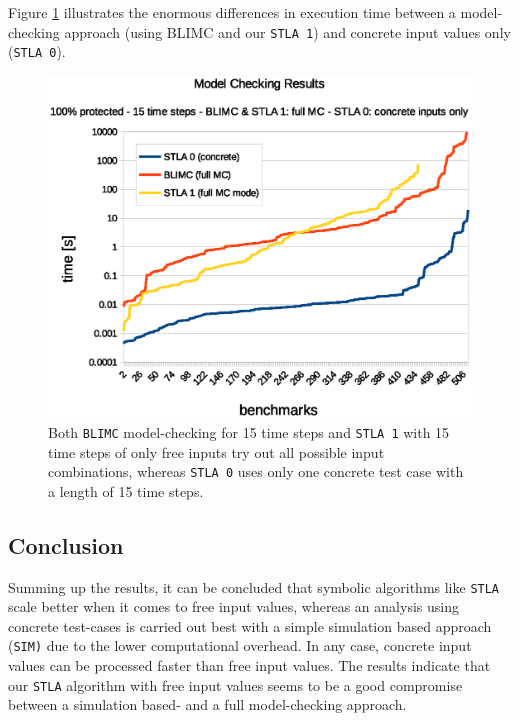 \documentclass[a4paper,10pt]{article}
\begin{document}
Figure \ref{mc-chart} illustrates the enormous differences in execution time between a model-checking approach (using BLIMC and our \texttt{STLA 1}) and concrete input values only (\texttt{STLA 0}).


\begin{figure}[!htb]
\centering
\includegraphics[scale = 0.64]{img/mc.eps}
\centering \caption{Both \texttt{BLIMC} model-checking for 15 time steps and \texttt{STLA 1} with 15 time steps of only free inputs try out all possible input combinations, 
whereas \texttt{STLA 0} uses only one concrete test case with a length of 15 time steps. } 
\label{mc-chart}
\end{figure}

\subsection{Conclusion}
Summing up the results, it can be concluded that symbolic algorithms like \texttt{STLA} scale better when it comes to free input values, whereas an analysis using concrete test-cases is carried out best with 
a simple simulation based approach (\texttt{SIM)} due to the lower computational overhead. In any case, concrete input values can be processed faster than free input values.
The results indicate that our \texttt{STLA} algorithm with free input values seems to be a good compromise between a simulation based- and a full model-checking approach.
\end{document}
